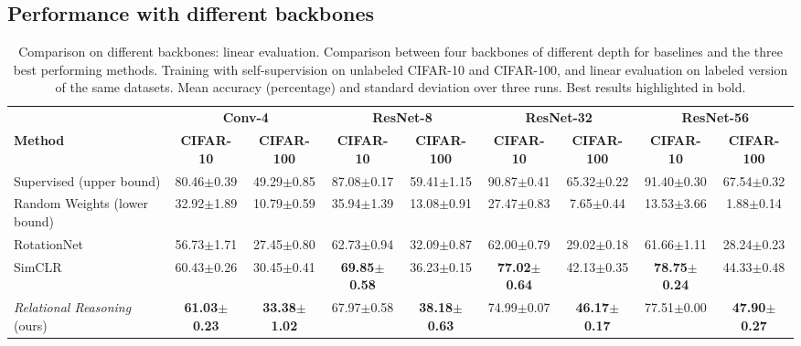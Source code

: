 \documentclass{article}
\begin{document}
\subsection{Performance with different backbones}\label{appendix:additional_backbones}

\begin{table}[H]
 \caption{Comparison on different backbones: linear evaluation. Comparison between four backbones of different depth for baselines and the three best performing methods. Training with self-supervision on unlabeled CIFAR-10 and CIFAR-100, and linear evaluation on labeled version of the same datasets. Mean accuracy (percentage) and standard deviation over three runs. Best results highlighted in bold.}
 \label{tab:backbones_linear}
 \begin{adjustbox}{width=1.0\columnwidth,center}
  \centering
  \begin{tabular}{lcccccccc}
    \toprule
     & \multicolumn{2}{c}{\textbf{Conv-4}} & \multicolumn{2}{c}{\textbf{ResNet-8}} & \multicolumn{2}{c}{\textbf{ResNet-32}} & \multicolumn{2}{c}{\textbf{ResNet-56}}\\
    \cmidrule[0.1pt](r){2-3} \cmidrule[0.1pt](l){4-5} \cmidrule[0.1pt](l){6-7} \cmidrule[0.1pt](l){8-9}
    \textbf{Method} &
    \textbf{CIFAR-10} & \textbf{CIFAR-100} &
    \textbf{CIFAR-10} & \textbf{CIFAR-100} &
    \textbf{CIFAR-10} & \textbf{CIFAR-100} &
    \textbf{CIFAR-10} & \textbf{CIFAR-100} \\
    \midrule
    Supervised (upper bound) & 
    80.46$\pm$\small{0.39} & 49.29$\pm$\small{0.85} &
    87.08$\pm$\small{0.17} & 59.41$\pm$\small{1.15} &
    90.87$\pm$\small{0.41} & 65.32$\pm$\small{0.22} &
    91.40$\pm$\small{0.30} & 67.54$\pm$\small{0.32} \\
    Random Weights (lower bound) & 
    32.92$\pm$\small{1.89} & 10.79$\pm$\small{0.59} &
    35.94$\pm$\small{1.39} & 13.08$\pm$\small{0.91} &
    27.47$\pm$\small{0.83} &  7.65$\pm$\small{0.44} &
    13.53$\pm$\small{3.66} &  1.88$\pm$\small{0.14} \\
    \cmidrule(l){1-9}
    RotationNet \citep{gidaris2018unsupervised} & 
    56.73$\pm$\small{1.71} & 27.45$\pm$\small{0.80} &
    62.73$\pm$\small{0.94} & 32.09$\pm$\small{0.87} &
    62.00$\pm$\small{0.79} & 29.02$\pm$\small{0.18} &
    61.66$\pm$\small{1.11} & 28.24$\pm$\small{0.23} \\
    SimCLR \citep{chen2020simple} & 
    60.43$\pm$\small{0.26} & 30.45$\pm$\small{0.41} &
    \textbf{69.85$\pm$\small{0.58}} & 36.23$\pm$\small{0.15} &
    \textbf{77.02$\pm$\small{0.64}} & 42.13$\pm$\small{0.35} &
    \textbf{78.75$\pm$\small{0.24}} & 44.33$\pm$\small{0.48} \\    
    \emph{Relational Reasoning} (ours) & 
    \textbf{61.03$\pm$\small{0.23}} & \textbf{33.38$\pm$\small{1.02}} &
    67.97$\pm$\small{0.58} & \textbf{38.18$\pm$\small{0.63}} &
    74.99$\pm$\small{0.07} & \textbf{46.17$\pm$\small{0.17}} &
    77.51$\pm$\small{0.00} & \textbf{47.90$\pm$\small{0.27}} \\
    \bottomrule
  \end{tabular}
 \end{adjustbox}
\end{table}
\end{document}
